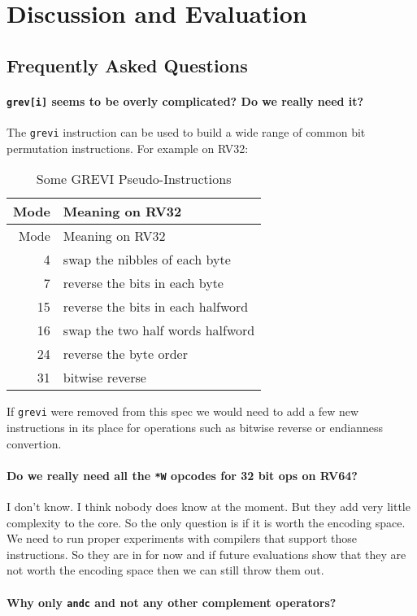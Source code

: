 \chapter{Discussion and Evaluation}

\section{Frequently Asked Questions}

\subsubsection{\texttt{grev[i]} seems to be overly complicated? Do we really need it?}

The \texttt{grevi} instruction can be used to build a wide range of common
bit permutation instructions. For example on RV32:

\begin{longtable}[c]{@{}rl@{}}
\caption{Some GREVI Pseudo-Instructions}\tabularnewline
\toprule
Mode & Meaning on RV32\tabularnewline
\midrule
\endfirsthead
\toprule
Mode & Meaning on RV32\tabularnewline
\midrule
\endhead
4 & swap the nibbles of each byte\tabularnewline
7 & reverse the bits in each byte\tabularnewline
15 & reverse the bits in each halfword\tabularnewline
16 & swap the two half words halfword\tabularnewline
24 & reverse the byte order\tabularnewline
31 & bitwise reverse\tabularnewline
\bottomrule
\end{longtable}

If \texttt{grevi} were removed from this spec we would need to add a few new
instructions in its place for operations such as bitwise reverse or
endianness convertion.

\subsubsection{Do we really need all the \texttt{*W} opcodes for 32 bit ops on RV64?}

I don't know. I think nobody does know at the moment. But they add very little
complexity to the core. So the only question is if it is worth the encoding
space. We need to run proper experiments with compilers that support those
instructions. So they are in for now and if future evaluations show that they
are not worth the encoding space then we can still throw them out.

\subsubsection{Why only \texttt{andc} and not any other complement operators?}

